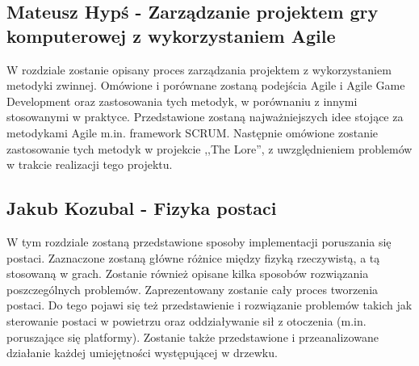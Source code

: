 \documentclass[oneside,polski,logo]{amuthesis}
\begin{document}
\subsection{Mateusz Hypś - Zarządzanie projektem gry komputerowej z wykorzystaniem Agile}
W rozdziale zostanie opisany proces zarządzania projektem z wykorzystaniem metodyki zwinnej. Omówione i porównane zostaną podejścia Agile i Agile Game Development oraz zastosowania tych metodyk, w porównaniu z innymi stosowanymi w praktyce. Przedstawione zostaną najważniejszych idee stojące za metodykami Agile m.in. framework SCRUM. Następnie omówione zostanie zastosowanie tych metodyk w projekcie ,,The Lore”, z uwzględnieniem problemów w trakcie realizacji tego projektu. 

\subsection{Jakub Kozubal - Fizyka postaci}
W tym rozdziale zostaną przedstawione sposoby implementacji poruszania się postaci. Zaznaczone zostaną główne różnice między fizyką rzeczywistą, a tą stosowaną w grach. Zostanie również opisane kilka sposobów rozwiązania poszczególnych problemów. Zaprezentowany zostanie cały proces tworzenia postaci. Do tego pojawi się też przedstawienie i rozwiązanie problemów takich jak sterowanie postaci w powietrzu oraz oddziaływanie sił z otoczenia (m.in. poruszające się platformy). Zostanie także przedstawione i przeanalizowane działanie każdej umiejętności występującej w drzewku.
\end{document}

